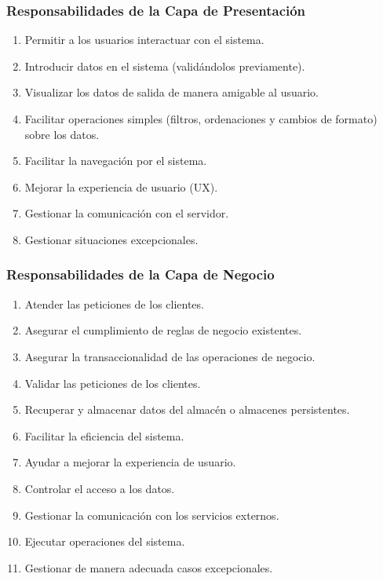 \documentclass[a4paper,slidestop,xcolor=pst,dvips,blue]{beamer}
\begin{document}

\begin{frame}[c]
	\frametitle{Responsabilidades de la Capa de Presentación}
	\begin{enumerate}[<+->]
        \item Permitir a los usuarios interactuar con el sistema.
        \item Introducir datos en el sistema (validándolos previamente).
        \item Visualizar los datos de salida de manera amigable al usuario.
        \item Facilitar operaciones simples (filtros, ordenaciones y cambios de formato) sobre los datos.
        \item Facilitar la navegación por el sistema.
        \item Mejorar la experiencia de usuario (UX). %
        \item Gestionar la comunicación con el servidor.
        \item Gestionar situaciones excepcionales.
	\end{enumerate}
\end{frame}

\begin{frame}[c]
	\frametitle{Responsabilidades de la Capa de Negocio}
	\begin{enumerate}[<+->]
        \item Atender las peticiones de los clientes.
        \item Asegurar el cumplimiento de \alert{reglas de negocio} existentes.
        \item Asegurar la \alert{transaccionalidad} de las operaciones de negocio.
        \item Validar las peticiones de los clientes.
        \item Recuperar y almacenar datos del almacén o almacenes persistentes.
        \item Facilitar la eficiencia del sistema.
        \item Ayudar a mejorar la experiencia de usuario.
        \item Controlar el acceso a los datos.
        \item Gestionar la comunicación con los servicios externos.
        \item Ejecutar operaciones del sistema.
        \item Gestionar de manera adecuada casos excepcionales.
	\end{enumerate}
\end{frame}
\end{document}
